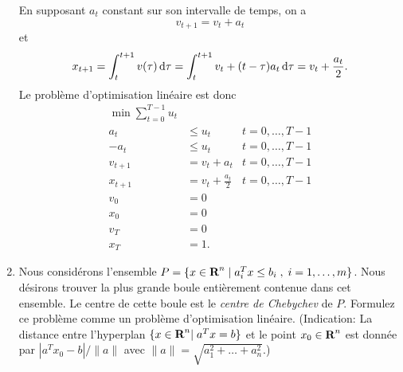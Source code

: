 \begin{enumerate}
    \begin{solution}
      En supposant $a_t$ constant sur son intervalle de temps, on a
      \[ v_{t+1} = v_t + a_t \]
      et
      \[ x_{t+1} = \int_t^{t+1} v(\tau) \operatorname{d}\! \tau
      = \int_t^{t+1} v_t + (t-\tau)a_t \operatorname{d}\! \tau
      = v_t + \frac{a_t}{2}. \]
      Le problème d'optimisation linéaire est donc
      \begin{align*}
        \min \sum_{t=0}^{T-1} u_t\\
        a_t & \leq u_t & t = 0,\ldots,T-1\\
        -a_t & \leq u_t & t = 0,\ldots,T-1\\
        v_{t+1} & = v_t + a_t & t = 0,\ldots,T-1\\
        x_{t+1} & = v_t + \frac{a_t}{2} & t = 0,\ldots,T-1\\
        v_0 & = 0\\
        x_0 & = 0\\
        v_T & = 0\\
        x_T & = 1.
      \end{align*}
    \end{solution}



  \item Nous considérons l'ensemble $P=\{ x \in {\mbox{\bf R}}^n \; | \; a_i^T x \leq b_i \; , \;  i=1, \ldots, m \}$. Nous désirons trouver la
    plus grande boule entièrement contenue dans cet ensemble. Le centre de cette boule est  le {\it centre de Chebychev} de $P$.  Formulez
    ce problème comme un problème d'optimisation linéaire. (Indication:  La distance entre l'hyperplan $\{x \in {\mbox{\bf R}}^n | \;  a^Tx=b \}$ et le point $x_0 \in {\mbox{\bf R}}^n$
    est donnée par
    $|a^Tx_0 - b|/\|a\|$ avec $\|a\|=\sqrt{a_1^2+ \ldots + a_n^2}$.)


\end{enumerate}
